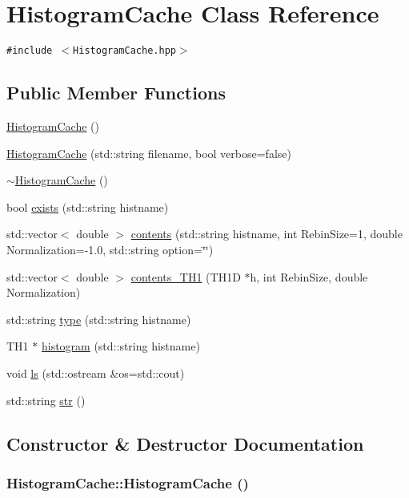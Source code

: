 \hypertarget{classHistogramCache}{
\section{Histogram\-Cache Class Reference}
\label{classHistogramCache}
}
{\tt \#include $<$Histogram\-Cache.hpp$>$}

\subsection*{Public Member Functions}
\begin{CompactItemize}
\item 
\hyperlink{classHistogramCache_a0}{Histogram\-Cache} ()
\item 
\hyperlink{classHistogramCache_a1}{Histogram\-Cache} (std::string filename, bool verbose=false)
\item 
\hyperlink{classHistogramCache_a2}{$\sim$Histogram\-Cache} ()
\item 
bool \hyperlink{classHistogramCache_a3}{exists} (std::string histname)
\item 
std::vector$<$ double $>$ \hyperlink{classHistogramCache_a4}{contents} (std::string histname, int Rebin\-Size=1, double Normalization=-1.0, std::string option=\char`\"{}\char`\"{})
\item 
std::vector$<$ double $>$ \hyperlink{classHistogramCache_a5}{contents\_\-TH1} (TH1D $\ast$h, int Rebin\-Size, double Normalization)
\item 
std::string \hyperlink{classHistogramCache_a6}{type} (std::string histname)
\item 
TH1 $\ast$ \hyperlink{classHistogramCache_a7}{histogram} (std::string histname)
\item 
void \hyperlink{classHistogramCache_a8}{ls} (std::ostream \&os=std::cout)
\item 
std::string \hyperlink{classHistogramCache_a9}{str} ()
\end{CompactItemize}


\subsection{Constructor \& Destructor Documentation}
\hypertarget{classHistogramCache_a0}{
\subsubsection[HistogramCache]{\setlength{\rightskip}{0pt plus 5cm}Histogram\-Cache::Histogram\-Cache ()}}
\label{classHistogramCache_a0}



